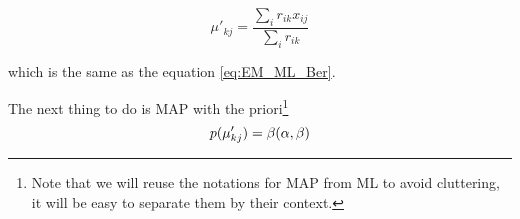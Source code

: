 \documentclass[a4paper,twoside=false,abstract=false,numbers=noenddot,
titlepage=false,headings=small,parskip=half,version=last]{scrartcl}
\begin{document}
\begin{solution}
    \begin{equation}
        \mu'_{kj} = \frac{
            \sum_i r_{ik}x_{ij}
        }
        {
            \sum_i r_{ik}
        }
    \end{equation}

    which is the same as the equation \eqref{eq:EM_ML_Ber}.

    The next thing to do is MAP with the priori\footnote{Note that we will
    reuse the notations for MAP from ML to avoid cluttering, it will be easy to
    separate them by their context.}
    \begin{equation}
        p{(\mu'_{kj})} = \beta(\alpha,\beta) 
    \end{equation}
     

\end{solution}

\end{document}
